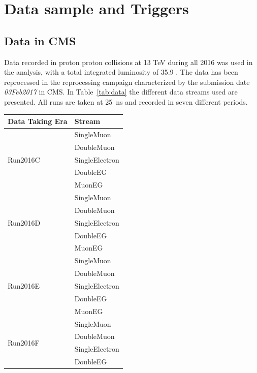 \section{Data sample and Triggers}
\subsection*{Data in CMS}
Data recorded in proton proton collisions at 13 TeV during all 2016 was used in the analysis, with a total integrated luminosity of  35.9 \fbinv.
The data has been reprocessed in the reprocessing campaign characterized by the submission date \textit{03Feb2017} in CMS.
In Table~\ref{tab:data} the different data streams used are presented. All runs are taken at 25~ns and recorded in seven different periods.
\begin{table}
\begin{center}
\begin{tabular}{|l|l|}
\hline
Data Taking Era & Stream\\
\hline
\multirow{5}{*}{Run2016C} 	& SingleMuon  \\
                                & DoubleMuon \\
				& SingleElectron \\
                                & DoubleEG \\
				& MuonEG \\ \hline
\multirow{5}{*}{Run2016D}       & SingleMuon  \\
                                & DoubleMuon \\
                                & SingleElectron \\
                                & DoubleEG \\
                                & MuonEG \\ \hline
\multirow{5}{*}{Run2016E}       & SingleMuon  \\
                                & DoubleMuon \\
                                & SingleElectron \\
                                & DoubleEG \\
                                & MuonEG \\ \hline
\multirow{5}{*}{Run2016F}       & SingleMuon  \\
                                & DoubleMuon \\
                                & SingleElectron \\
                                & DoubleEG \\

\end{tabular}
\end{center}
\end{table}
